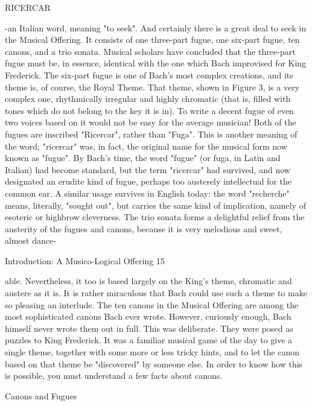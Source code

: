                                     RICERCAR

-an Italian word, meaning "to seek". And certainly there is a great deal to seek in the
Musical Offering. It consists of one three-part fugue, one six-part fugue, ten canons, and a
trio sonata. Musical scholars have concluded that the three-part fugue must be, in
essence, identical with the one which Bach improvised for King Frederick. The six-part
fugue is one of Bach's most complex creations, and its theme is, of course, the Royal
Theme. That theme, shown in Figure 3, is a very complex one, rhythmically irregular and
highly chromatic (that is, filled with tones which do not belong to the key it is in). To
write a decent fugue of even two voices based on it would not be easy for the average
musician!
   Both of the fugues are inscribed "Ricercar", rather than "Fuga". This is another
meaning of the word; "ricercar" was, in fact, the original name for the musical form now
known as "fugue". By Bach's time, the word "fugue" (or fuga, in Latin and Italian) had
become standard, but the term "ricercar" had survived, and now designated an erudite
kind of fugue, perhaps too austerely intellectual for the common ear. A similar usage
survives in English today: the word "recherche" means, literally, "sought out", but carries
the same kind of implication, namely of esoteric or highbrow cleverness.
   The trio sonata forms a delightful relief from the austerity of the fugues and canons,
because it is very melodious and sweet, almost dance-



Introduction: A Musico-Logical Offering                                                  15

able. Nevertheless, it too is based largely on the King's theme, chromatic and austere as it
is. It is rather miraculous that Bach could use such a theme to make so pleasing an
interlude.
  The ten canons in the Musical Offering are among the most sophisticated canons Bach
ever wrote. However, curiously enough, Bach himself never wrote them out in full. This
was deliberate. They were posed as puzzles to King Frederick. It was a familiar musical
game of the day to give a single theme, together with some more or less tricky hints, and
to let the canon based on that theme be "discovered" by someone else. In order to know
how this is possible, you must understand a few facts about canons.

                                    Canons and Fugues

